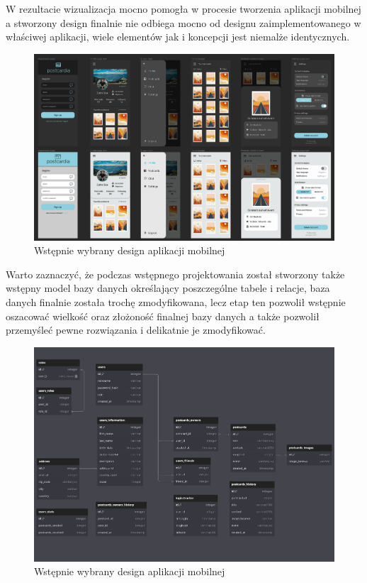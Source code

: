\documentclass[a4paper,twoside,12pt]{book}
\begin{document}
W rezultacie wizualizacja mocno pomogła w procesie tworzenia aplikacji mobilnej a stworzony design finalnie nie odbiega mocno od designu zaimplementowanego w właściwej aplikacji, wiele elementów jak i koncepcji jest niemalże identycznych.



\begin{figure}[H]
    \centering
    \includegraphics[width=1\textwidth]{wizje_ss/figma-designs.png}
    \caption{Wstępnie wybrany design aplikacji mobilnej}
\end{figure}
\newpage
Warto zaznaczyć, że podczas wstępnego projektowania został stworzony także wstępny model bazy danych określający poszczególne tabele i relacje, baza danych finalnie została trochę zmodyfikowana, lecz etap ten pozwolił wstępnie oszacować wielkość oraz złożoność finalnej bazy danych a także pozwolił przemyśleć pewne rozwiązania i delikatnie je zmodyfikować.
\begin{figure}[H]
    \centering
    \includegraphics[width=1\textwidth]{wizje_ss/baza.png}
    \caption{Wstępnie wybrany design aplikacji mobilnej}
\end{figure}
\newpage
\end{document}
